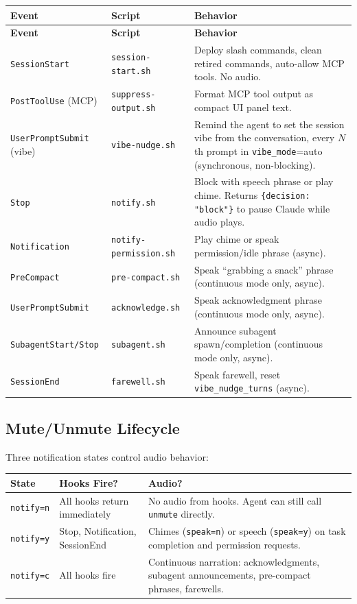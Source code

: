 \documentclass[a4paper,10pt]{article}
\newcommand{\tool}[1]{\texttt{#1}}
\newcommand{\field}[1]{\texttt{#1}}
\newcommand{\hook}[1]{\texttt{#1}}
\begin{document}
\begin{center}
\begin{longtable}{llp{5.5cm}}
\toprule
\textbf{Event} & \textbf{Script} & \textbf{Behavior} \\
\midrule
\endfirsthead
\toprule
\textbf{Event} & \textbf{Script} & \textbf{Behavior} \\
\midrule
\endhead
\hook{SessionStart}       & \texttt{session-start.sh} &
  Deploy slash commands, clean retired commands, auto-allow MCP
  tools.  No audio. \\
\hook{PostToolUse} (MCP)  & \texttt{suppress-output.sh} &
  Format MCP tool output as compact UI panel text. \\
\hook{UserPromptSubmit} (vibe) & \texttt{vibe-nudge.sh} &
  Remind the agent to set the session vibe from the conversation,
  every $N$th prompt in \field{vibe\_mode}=auto (synchronous,
  non-blocking). \\
\hook{Stop}               & \texttt{notify.sh} &
  Block with speech phrase or play chime.  Returns
  \texttt{\{decision: "block"\}} to pause Claude while audio
  plays. \\
\hook{Notification}       & \texttt{notify-permission.sh} &
  Play chime or speak permission/idle phrase (async). \\
\hook{PreCompact}         & \texttt{pre-compact.sh} &
  Speak ``grabbing a snack'' phrase (continuous mode only,
  async). \\
\hook{UserPromptSubmit}   & \texttt{acknowledge.sh} &
  Speak acknowledgment phrase (continuous mode only, async). \\
\hook{SubagentStart/Stop} & \texttt{subagent.sh} &
  Announce subagent spawn/completion (continuous mode only,
  async). \\
\hook{SessionEnd}         & \texttt{farewell.sh} &
  Speak farewell, reset \field{vibe\_nudge\_turns} (async). \\
\bottomrule
\end{longtable}
\end{center}

\subsection{Mute/Unmute Lifecycle}

Three notification states control audio behavior:

\begin{center}
\begin{tabular}{lp{4cm}p{4cm}}
\toprule
\textbf{State} & \textbf{Hooks Fire?} & \textbf{Audio?} \\
\midrule
\field{notify=n} & All hooks return immediately &
  No audio from hooks.  Agent can still call \tool{unmute}
  directly. \\
\field{notify=y} & Stop, Notification, SessionEnd &
  Chimes (\field{speak=n}) or speech (\field{speak=y}) on
  task completion and permission requests. \\
\field{notify=c} & All hooks fire &
  Continuous narration: acknowledgments, subagent
  announcements, pre-compact phrases, farewells. \\
\bottomrule
\end{tabular}
\end{center}
\end{document}
